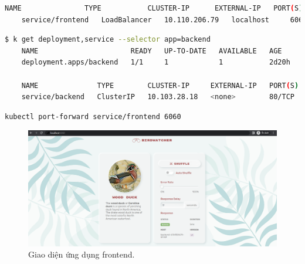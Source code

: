 \documentclass[14pt,a4paper]{report}
\begin{document}
{\begin{lstlisting}[language=Bash]
	NAME               TYPE           CLUSTER-IP      EXTERNAL-IP   PORT(S)          AGE
	service/frontend   LoadBalancer   10.110.206.79   localhost     6060:32589/TCP   2d20h
	\end{lstlisting}
	\begin{lstlisting}[language=Bash]
	$ k get deployment,service --selector app=backend
	NAME                      READY   UP-TO-DATE   AVAILABLE   AGE
	deployment.apps/backend   1/1     1            1           2d20h
	
	NAME              TYPE        CLUSTER-IP     EXTERNAL-IP   PORT(S)   AGE
	service/backend   ClusterIP   10.103.28.18   <none>        80/TCP    2d20h
	\end{lstlisting}

	\hspace{0.3cm}{Ở đây, con số của trạng thái sẵn sàng là 1/1, thì ứng dụng của chúng ta đã được triển khai thành công. Service của các ứng dụng đã được mở cổng như chúng ta mong đợi. Và tiếp theo, chúng ta sẽ bắt đầu truy cập vào UI của ứng dụng frontend và xem kết quả.}
	
	\hspace{0.3cm}{Để truy cập được vào UI của ứng dụng, chúng ta sẽ sử dụng câu lệnh port-forward để mở port của ứng dụng ra bên ngoài máy của chúng ta. Câu lệnh được thực thi như sau:}
	\begin{lstlisting}[language=Bash]
	kubectl port-forward service/frontend 6060
	\end{lstlisting}
	\pagebreak
	
	\begin{figure}[h]
		\centering
		\includegraphics[width=1\linewidth]{Pics/localhost-6060}
		\caption{\label{fig:localhost-6060} Giao diện ứng dụng frontend.}
		\label{fig:localhost-6060}
	\end{figure}

}
\end{document}
